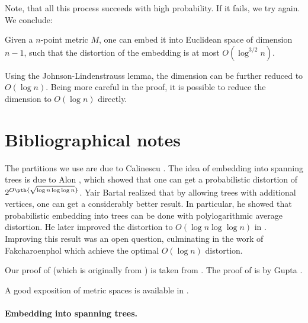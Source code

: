 Note, that all this process succeeds with high probability. If it
fails, we try again.  We conclude:

\begin{theorem}
    Given a $n$-point metric $M$, one can embed it into Euclidean
    space of dimension $n-1$, such that the distortion of the
    embedding is at most $O(\log^{3/2} n)$.
\end{theorem}

Using the Johnson-Lindenstrauss lemma, the dimension can be further
reduced to $O(\log n)$. Being more careful in the proof, it is
possible to reduce the dimension to $O(\log n)$ directly.



\section{Bibliographical notes}

The partitions we use are due to Calinescu \etal{}
\cite{ckr-aazep-04}. The idea of embedding into spanning trees is due
to Alon \etal{} \cite{akpw-gtgak-95}, which showed that one can get a
probabilistic distortion of $2^{O \pth{\sqrt{\log n \log \log n}}}$.
Yair Bartal realized that by allowing trees with additional vertices,
one can get a considerably better result. In particular, he showed
\cite{b-pamsa-96} that probabilistic embedding into trees can be done
with polylogarithmic average distortion. He later improved the
distortion to $O( \log n \log \log n)$ in \cite{b-aamtm-98}. Improving
this result was an open question, culminating in the work of
Fakcharoenphol \etal{} \cite{frt-tbaam-04} which achieve the optimal
$O(\log n)$ distortion.

Our proof of  (which is originally from
\cite{frt-tbaam-04}) is taken from \cite{klmn-mdnem-05}. The proof of
 is by Gupta \cite{g-efm-00}.

A good exposition of metric spaces is available in \Matousek{}
\cite{m-ldg-02}. 


\paragraph*{Embedding into spanning trees.}

